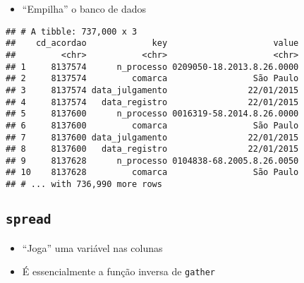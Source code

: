 \documentclass[]{book}
\newenvironment{Shaded}{\begin{snugshade}}{\end{snugshade}}
\newcommand{\KeywordTok}[1]{\textcolor[rgb]{0.13,0.29,0.53}{\textbf{{#1}}}}
\newcommand{\DataTypeTok}[1]{\textcolor[rgb]{0.13,0.29,0.53}{{#1}}}
\newcommand{\StringTok}[1]{\textcolor[rgb]{0.31,0.60,0.02}{{#1}}}
\newcommand{\OtherTok}[1]{\textcolor[rgb]{0.56,0.35,0.01}{{#1}}}
\newcommand{\NormalTok}[1]{{#1}}
\providecommand{\tightlist}{%
  \setlength{\itemsep}{0pt}\setlength{\parskip}{0pt}}
\begin{document}
\begin{itemize}
\tightlist
\item
  ``Empilha'' o banco de dados
\end{itemize}

\begin{Shaded}
\end{Shaded}

\begin{verbatim}
## # A tibble: 737,000 x 3
##    cd_acordao             key                     value
##         <chr>           <chr>                     <chr>
## 1     8137574      n_processo 0209050-18.2013.8.26.0000
## 2     8137574         comarca                 São Paulo
## 3     8137574 data_julgamento                22/01/2015
## 4     8137574   data_registro                22/01/2015
## 5     8137600      n_processo 0016319-58.2014.8.26.0000
## 6     8137600         comarca                 São Paulo
## 7     8137600 data_julgamento                22/01/2015
## 8     8137600   data_registro                22/01/2015
## 9     8137628      n_processo 0104838-68.2005.8.26.0050
## 10    8137628         comarca                 São Paulo
## # ... with 736,990 more rows
\end{verbatim}

\subsection{\texorpdfstring{\texttt{spread}}{spread}}\label{spread}

\begin{itemize}
\tightlist
\item
  ``Joga'' uma variável nas colunas
\item
  É essencialmente a função inversa de \texttt{gather}
\end{itemize}

\begin{Shaded}
\end{Shaded}
\end{document}
